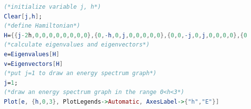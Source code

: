 \documentclass[uplatex,a4j,11pt,dvipdfmx]{jsarticle}
\begin{document}
\newpage
\begin{lstlisting}[language=mathematica, caption=Mathematicaによる固有値方程式の計算コード(式中の$J$をプログラム内では$j$としている)]
(*initialize variable j, h*)
Clear[j,h];
(*define Hamiltonian*)
H={{j-2h,0,0,0,0,0,0,0,0},{0,-h,0,j,0,0,0,0,0},{0,0,-j,0,j,0,0,0,0},{0,j,0,-h,0,0,0,0,0},{0,0,j,0,0,0,j,0,0},{0,0,0h,0,0,h,0,j,0},{0,0,0,0,j,0,-j,0,0},{0,0,0,0,0,j,0,h,0},{0,0,0,0,0,0,0,0,j+2h}};
(*calculate eigenvalues and eigenvectors*)
e=Eigenvalues[H]
v=Eigenvectors[H]
(*put j=1 to draw an energy spectrum graph*)
j=1;
(*draw an energy spectrum graph in the range 0<h<3*)
Plot[e, {h,0,3}, PlotLegends->Automatic, AxesLabel->{"h","E"}]
\end{lstlisting}

\end{document}
